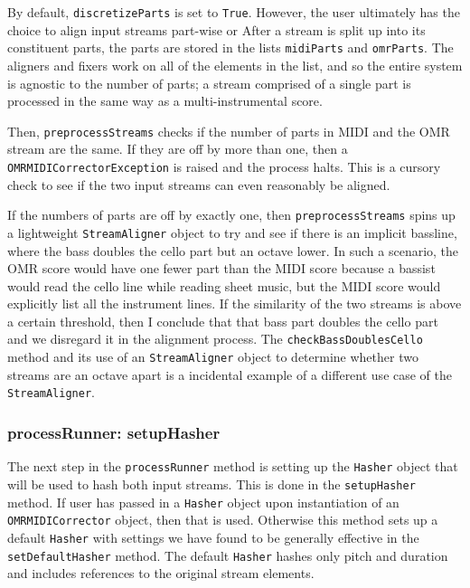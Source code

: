 By default, \texttt{discretizeParts} is set to \texttt{True}. However, the user ultimately has the choice to align input streams part-wise or After a stream is split up into its constituent parts, the parts are stored in the lists \texttt{midiParts} and \texttt{omrParts}. The aligners and fixers work on all of the elements in the list, and so the entire system is agnostic to the number of parts; a stream comprised of a single part is processed in the same way as a multi-instrumental score. 

Then, \texttt{preprocessStreams} checks if the number of parts in MIDI and the OMR stream are the same. If they are off by more than one, then a \texttt{OMRMIDICorrectorException} is raised and the process halts. This is a cursory check to see if the two input streams can even reasonably be aligned.

If the numbers of parts are off by exactly one, then \texttt{preprocessStreams} spins up a lightweight \texttt{StreamAligner} object to try and see if there is an implicit bassline, where the bass doubles the cello part but an octave lower. In such a scenario, the OMR score would have one fewer part than the MIDI score because a bassist would read the cello line while reading sheet music, but the MIDI score would explicitly list all the instrument lines. If the similarity of the two streams is above a certain threshold, then I conclude that that bass part doubles the cello part and we disregard it in the alignment process. The \texttt{checkBassDoublesCello} method and its use of an \texttt{StreamAligner} object to determine whether two streams are an octave apart is a incidental example of a different use case of the \texttt{StreamAligner}.

\subsubsection{processRunner: setupHasher} \label{setuphasher}
The next step in the \texttt{processRunner} method is setting up the \texttt{Hasher} object that will be used to hash both input streams. This is done in the \texttt{setupHasher} method. If user has passed in a \texttt{Hasher} object upon instantiation of an \texttt{OMRMIDICorrector} object, then that is used. Otherwise this method sets up a default \texttt{Hasher} with settings we have found to be generally effective in the \texttt{setDefaultHasher} method. The default \texttt{Hasher} hashes only pitch and duration and includes references to the original stream elements. 

